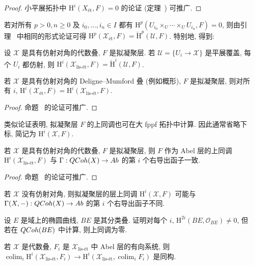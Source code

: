 \begin{proof}
小平展拓扑中 $\mathrm H^i(X_{\text{ét}},F)=0$ 的论证 (定理~) 可推广.
\end{proof}
若对所有 $p>0,n\geq0$ 及 $i_0,\ldots,i_n\in I$ 都有 $\mathrm H^p(U_{i_0}\times_U\cdots\times_U U_{i_n},F)=0$, 则由引理~ 中相同的形式论证可得 $\mathrm H^p(\mathcal X_{\text{ét}},F)=\check{\mathrm H}^p(\mathcal U,F)$. 特别地, 得到:
\begin{lemma}\label{src:7.1.27}
设 $\mathcal X$ 是具有仿射对角的代数叠, $F$ 是拟凝聚层. 若 $\mathcal U=\{U_i\to\mathcal X\}$ 是平展覆盖, 每个 $U_i$ 都仿射, 则 $\mathrm H^i(\mathcal X_{\text{lis-ét}},F)=\check{\mathrm H}^i(\mathcal U,F)$.
\end{lemma}
\begin{proposition}\label{src:7.1.28}
若 $\mathcal X$ 是具有仿射对角的 Deligne--Mumford 叠 (例如概形), $F$ 是拟凝聚层, 则对所有 $i$, $\mathrm H^i(\mathcal X_{\text{ét}},F)=\mathrm H^i(\mathcal X_{\text{lis-ét}},F)$.
\end{proposition}
\begin{proof}
命题~ 的论证可推广.
\end{proof}
类似论证表明, 拟凝聚层 $F$ 的上同调也可在大 fppf 拓扑中计算. 因此通常省略下标, 简记为 $\mathrm H^i(\mathcal X,F)$.
\begin{proposition}\label{src:7.1.29}
若 $\mathcal X$ 是具有仿射对角的代数叠, $F$ 是拟凝聚层, 则 $F$ 作为 Abel 层的上同调 $\mathrm H^i(\mathcal X_{\text{lis-ét}},F)$ 与 $\Gamma:QCoh(X)\to Ab$ 的第 $i$ 个右导出函子一致.
\end{proposition}
\begin{proof}
命题~ 的论证可推广.
\end{proof}
若 $\mathcal X$ 没有仿射对角, 则拟凝聚层的层上同调 $\mathrm H^i(\mathcal X,F)$ 可能与 $\Gamma(X,-):QCoh(X)\to Ab$ 的第 $i$ 个右导出函子不同.
\begin{exercise}\label{src:7.1.30}
设 $E$ 是域上的椭圆曲线, $BE$ 是其分类叠. 证明对每个 $i$, $\mathrm H^{2i}(BE,\mathcal O_{BE})\neq0$, 但若在 $QCoh(BE)$ 中计算, 则上同调为零.
\end{exercise}
\begin{proposition}\label{src:7.1.31}
若 $\mathcal X$ 是代数叠, $F_i$ 是 $\mathcal X_{\text{lis-ét}}$ 中 Abel 层的有向系统, 则 $\operatorname{colim}_i\mathrm H^i(\mathcal X_{\text{lis-ét}},F_i)\to\mathrm H^i(\mathcal X_{\text{lis-ét}},\operatorname{colim}_iF_i)$ 是同构.
\end{proposition}
